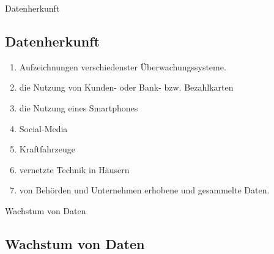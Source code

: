 \documentclass[11pt]{beamer}
\begin{document}
\begin{frame}{Datenherkunft}
\subsection{Datenherkunft}
\begin{enumerate}
\item Aufzeichnungen verschiedenster Überwachungssysteme.
\item die Nutzung von Kunden- oder Bank- bzw. Bezahlkarten 
\item die Nutzung eines Smartphones
\item Social-Media
\item Kraftfahrzeuge
\item vernetzte Technik in Häusern
\item von Behörden und Unternehmen erhobene und gesammelte Daten.

\end{enumerate}

\end{frame}

\begin{frame}{Wachstum von Daten}
\subsection{Wachstum von Daten}
	\begin{figure}
	\end{figure}
\end{frame}
\end{document}
